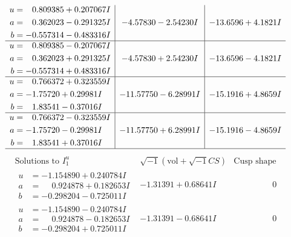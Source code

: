 \documentclass[1p]{elsarticle_modified}
\theoremstyle{definition}
\newcommand{\I}{\sqrt{-1}}
\begin{document}
$$\begin{array}{c|c|c}
\begin{aligned}
u &= \phantom{-}0.809385 + 0.207067 I \\
a &= \phantom{-}0.362023 - 0.291325 I \\
b &= -0.557314 - 0.483316 I\end{aligned}
 & -4.57830 - 2.54230 I & -13.6596 + 4.1821 I \\ \hline\begin{aligned}
u &= \phantom{-}0.809385 - 0.207067 I \\
a &= \phantom{-}0.362023 + 0.291325 I \\
b &= -0.557314 + 0.483316 I\end{aligned}
 & -4.57830 + 2.54230 I & -13.6596 - 4.1821 I \\ \hline\begin{aligned}
u &= \phantom{-}0.766372 + 0.323559 I \\
a &= -1.75720 + 0.29981 I \\
b &= \phantom{-}1.83541 - 0.37016 I\end{aligned}
 & -11.57750 - 6.28991 I & -15.1916 + 4.8659 I \\ \hline\begin{aligned}
u &= \phantom{-}0.766372 - 0.323559 I \\
a &= -1.75720 - 0.29981 I \\
b &= \phantom{-}1.83541 + 0.37016 I\end{aligned}
 & -11.57750 + 6.28991 I & -15.1916 - 4.8659 I\\
 \hline 
 \end{array}$$\newpage$$\begin{array}{c|c|c}  
\text{Solutions to }I^u_{1}& \I (\text{vol} + \sqrt{-1}CS) & \text{Cusp shape}\\
 \hline 
\begin{aligned}
u &= -1.154890 + 0.240784 I \\
a &= \phantom{-}0.924878 + 0.182653 I \\
b &= -0.298204 - 0.725011 I\end{aligned}
 & -1.31391 + 0.68641 I & \phantom{-0.000000 } 0 \\ \hline\begin{aligned}
u &= -1.154890 - 0.240784 I \\
a &= \phantom{-}0.924878 - 0.182653 I \\
b &= -0.298204 + 0.725011 I\end{aligned}
 & -1.31391 - 0.68641 I & \phantom{-0.000000 } 0 \\ \hline\begin{aligned}

\end{aligned}
\end{array}$$
\end{document}
